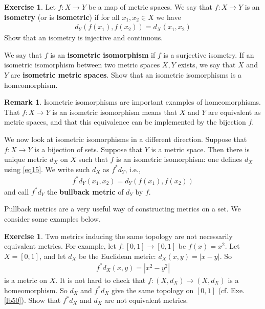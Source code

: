 \documentclass[12pt,b5paper,notitlepage]{article}
\theoremstyle{definition}
\newtheorem{exe}[df]{Exercise}
\newtheorem{rem}[df]{Remark}
\theoremstyle{plain}
\numberwithin{equation}{section}
\begin{document}
\begin{exe}\label{lb46}
Let $f:X\rightarrow Y$ be a map of metric spaces. We say that $f:X\rightarrow Y$ is an \textbf{isometry} (or is \textbf{isometric})  if for all $x_1,x_2\in X$ we have
\begin{align}
d_Y(f(x_1),f(x_2))=d_X(x_1,x_2) \label{eq15}
\end{align}
Show that an isometry is injective and continuous.

We say that $f$ is an \textbf{isometric isomorphism} if $f$ is a surjective isometry. If an isometric isomorphism between two metric spaces $X,Y$ exists, we say that $X$ and $Y$ are \textbf{isometric metric spaces}. Show that an isometric isomorphisms is a homeomorphism.   \hfill\qedsymbol
\end{exe}

\begin{rem}
Isometric isomorphisms are important examples of homeomorphisms. That $f:X\rightarrow Y$ is an isometric isomorphism means that $X$ and $Y$ are equivalent as metric spaces, and that this equivalence can be implemented by the bijection $f$. 

We now look at isometric isomorphisms in a different direction. Suppose that $f:X\rightarrow Y$ is a bijection of sets. Suppose that $Y$ is a metric space. Then there is unique metric $d_X$ on $X$ such that $f$ is an isometric isomorphism: one defines $d_X$ using \eqref{eq15}. We write such $d_X$ as $f^*d_Y$,   i.e.,
\begin{align*}
f^*d_Y(x_1,x_2)=d_Y(f(x_1),f(x_2))
\end{align*}
and call $f^*d_Y$ the \textbf{bullback metric}  of $d_Y$ by $f$. \hfill\qedsymbol
\end{rem}

Pullback metrics are a very useful way of constructing metrics on a set. We consider some examples below. 


\begin{exe}\label{lb49}
Two metrics inducing the same topology are not necessarily equivalent metrics. For example, let $f:[0,1]\rightarrow [0,1]$ be $f(x)=x^2$. Let $X=[0,1]$, and let $d_X$ be the  Euclidean metric: $d_X(x,y)=|x-y|$. So
\begin{align*}
f^*d_X(x,y)=|x^2-y^2|
\end{align*}
is a metric on $X$. It is not hard to check that $f:(X,d_X)\rightarrow (X,d_X)$ is a homeomorphism.  So $d_X$ and $f^*d_X$ give the same topology on $[0,1]$ (cf. Exe. \ref{lb50}). Show that $f^*d_X$ and $d_X$ are not equivalent metrics.
\end{exe}
\end{document}
